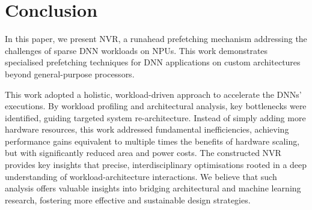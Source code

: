 \section{Conclusion}





In this paper, we present NVR, a runahead prefetching mechanism addressing the challenges of sparse DNN workloads on NPUs. 
This work demonstrates specialised prefetching techniques for DNN applications on custom architectures beyond general-purpose processors.

This work adopted a holistic, workload-driven approach to accelerate the DNNs' executions. 
By workload profiling and architectural analysis, key bottlenecks were identified, guiding targeted system re-architecture. 
Instead of simply adding more hardware resources, this work addressed fundamental inefficiencies, achieving performance gains equivalent to multiple times the benefits of hardware scaling, but with significantly reduced area and power costs. 
The constructed NVR provides key insights that precise, interdisciplinary optimisations rooted in a deep understanding of workload-architecture interactions. 
We believe that such analysis offers valuable insights into bridging architectural and machine learning research, fostering more effective and sustainable design strategies.

